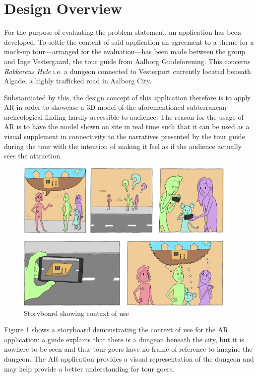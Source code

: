 \section{Design Overview}\label{sec:design}
For the purpose of evaluating the problem statement, an application has been developed. To settle the content of said application an agreement to a theme for a mock-up tour---arranged for the evaluation---has been made between the group and Inge Vestergaard, the tour guide from Aalborg Guideforening. This concerns \textit{Rakkerens Hule} i.e. a dungeon connected to Vesterport currently located beneath Algade, a highly trafficked road in Aalborg City. 

Substantiated by this, the design concept of this application therefore is to apply AR in order to showcase a 3D model of the aforementioned subterranean archeological finding hardly accessible to audience. The reason for the usage of AR is to have the model shown on site in real time such that it can be used as a visual supplement in connectivity to the narratives presented by the tour guide during the tour with the intention of making it feel as if the audience actually sees the attraction.

\begin{figure}[h!]
   \centering
   \includegraphics[width=0.95\textwidth]{figures/storyboard.jpg}
   \caption{Storyboard showing context of use}\label{fig:storyboard}
\end{figure}

Figure \ref{fig:storyboard} shows a storyboard demonstrating the context of use for the AR application: a guide explains that there is a dungeon beneath the city, but it is nowhere to be seen and thus tour goers have no frame of reference to imagine the dungeon. The AR application provides a visual representation of the dungeon and may help provide a better understanding for tour goers.

